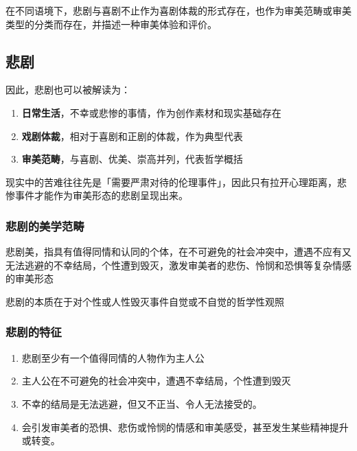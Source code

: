 \documentclass{NoteThesis/note-thesis}
\begin{document}
在不同语境下，悲剧与喜剧不止作为喜剧体裁的形式存在，也作为审美范畴或审美类型的分类而存在，并描述一种审美体验和评价。

\subsection{悲剧}

因此，悲剧也可以被解读为：

\begin{enumerate}
    \item \textbf{日常生活}，不幸或悲惨的事情，作为创作素材和现实基础存在
    \item \textbf{戏剧体裁}，相对于喜剧和正剧的体裁，作为典型代表
    \item \textbf{审美范畴}，与喜剧、优美、崇高并列，代表哲学概括
\end{enumerate}

现实中的苦难往往先是「需要严肃对待的伦理事件」，因此只有拉开心理距离，悲惨事件才能作为审美形态的悲剧呈现出来。

\subsubsection{\texorpdfstring{\mbox{}}{} 悲剧的美学范畴}

悲剧美，指具有值得同情和认同的个体，在不可避免的社会冲突中，遭遇不应有又无法逃避的不幸结局，个性遭到毁灭，激发审美者的悲伤、怜悯和恐惧等复杂情感的审美形态

\begin{mynote_env}[frametitle={悲剧的本质}]
    悲剧的本质在于对个性或人性毁灭事件自觉或不自觉的哲学性观照
\end{mynote_env}

\subsubsection{悲剧的特征}

\begin{enumerate}
    \item 悲剧至少有一个值得同情的人物作为主人公
    \item 主人公在不可避免的社会冲突中，遭遇不幸结局，个性遭到毁灭
    \item 不幸的结局是无法逃避，但又不正当、令人无法接受的。
    \item 会引发审美者的恐惧、悲伤或怜悯的情感和审美感受，甚至发生某些精神提升或转变。
\end{enumerate}
\end{document}
